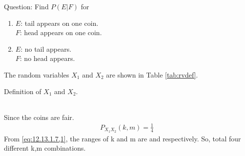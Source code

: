 \documentclass[journal,11pt,twocolumn]{IEEEtran}
\begin{document}
Question: Find $P(E|F)$ for
\begin{enumerate}
\item$E$: tail appears on one coin.\\
   $F$: head appears on one coin.
\item$E$: no tail appears.\\
    $F$: no head appears.
\end{enumerate}
\solution 
The random variables $X_1$ and $X_2$ are shown in Table \ref{tab:rvdef}.
\begin{table}[!ht]
\centering

\caption{Definition of $X_1$ and $X_2$.}
\label{tab:rvdef}
\end{table}\\
    Since the coins are fair.
\begin{align}
P_{X_1X_2}(k,m)=\frac{1}{4}
\label{eq:12.13.1.7,1}
\end{align}
From \eqref{eq:12.13.1.7,1}, the ranges of k and m are  and  respectively. So, total four different k,m combinations.
\end{document}
